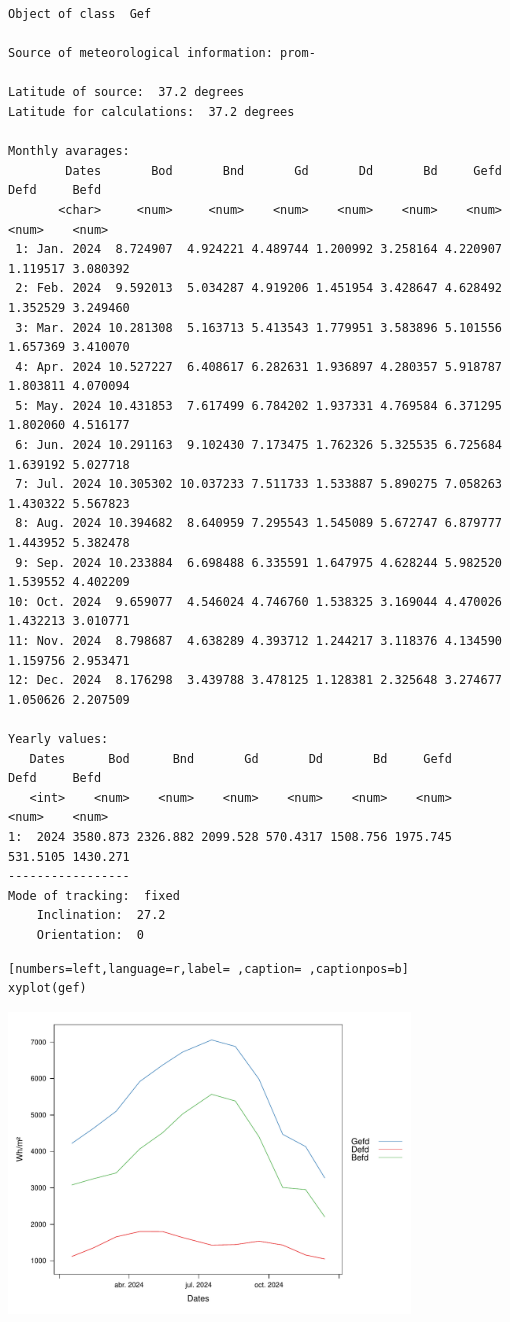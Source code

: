 \begin{verbatim}
Object of class  Gef 

Source of meteorological information: prom- 

Latitude of source:  37.2 degrees
Latitude for calculations:  37.2 degrees

Monthly avarages:
        Dates       Bod       Bnd       Gd       Dd       Bd     Gefd     Defd     Befd
       <char>     <num>     <num>    <num>    <num>    <num>    <num>    <num>    <num>
 1: Jan. 2024  8.724907  4.924221 4.489744 1.200992 3.258164 4.220907 1.119517 3.080392
 2: Feb. 2024  9.592013  5.034287 4.919206 1.451954 3.428647 4.628492 1.352529 3.249460
 3: Mar. 2024 10.281308  5.163713 5.413543 1.779951 3.583896 5.101556 1.657369 3.410070
 4: Apr. 2024 10.527227  6.408617 6.282631 1.936897 4.280357 5.918787 1.803811 4.070094
 5: May. 2024 10.431853  7.617499 6.784202 1.937331 4.769584 6.371295 1.802060 4.516177
 6: Jun. 2024 10.291163  9.102430 7.173475 1.762326 5.325535 6.725684 1.639192 5.027718
 7: Jul. 2024 10.305302 10.037233 7.511733 1.533887 5.890275 7.058263 1.430322 5.567823
 8: Aug. 2024 10.394682  8.640959 7.295543 1.545089 5.672747 6.879777 1.443952 5.382478
 9: Sep. 2024 10.233884  6.698488 6.335591 1.647975 4.628244 5.982520 1.539552 4.402209
10: Oct. 2024  9.659077  4.546024 4.746760 1.538325 3.169044 4.470026 1.432213 3.010771
11: Nov. 2024  8.798687  4.638289 4.393712 1.244217 3.118376 4.134590 1.159756 2.953471
12: Dec. 2024  8.176298  3.439788 3.478125 1.128381 2.325648 3.274677 1.050626 2.207509

Yearly values:
   Dates      Bod      Bnd       Gd       Dd       Bd     Gefd     Defd     Befd
   <int>    <num>    <num>    <num>    <num>    <num>    <num>    <num>    <num>
1:  2024 3580.873 2326.882 2099.528 570.4317 1508.756 1975.745 531.5105 1430.271
-----------------
Mode of tracking:  fixed 
    Inclination:  27.2 
    Orientation:  0
\end{verbatim}

\begin{lstlisting}[numbers=left,language=r,label= ,caption= ,captionpos=b]
xyplot(gef)
\end{lstlisting}

\begin{center}
\includegraphics[width=0.8\textwidth]{figuras/codigo-gef.pdf}
\end{center}

